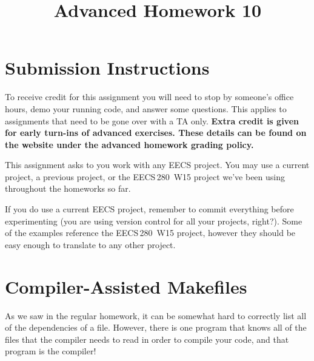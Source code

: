 \documentclass{article}
\begin{document}
\fancyfoot[C]{\color{gray} \thepage~/~\pageref*{LastPage}}
\pagestyle{fancyplain}

\title{\textbf{Advanced Homework 10\\}}
\author{\textbf{\color{red}{Due: Wednesday, March 21st, 11:59PM (Hard Deadline)}}}
\date{}
\maketitle


\section*{Submission Instructions}
To receive credit for this assignment you will need to stop by someone's
office hours, demo your running code, and answer some questions. \textbf{\color{red}{Make sure
to check the office hour schedule as the real due date is at the last office
hours before the date listed above.}} This applies to assignments that need to be gone over with a TA only.
\textbf{Extra credit is given for early turn-ins of advanced exercises. These details can be found on the website under the advanced homework grading policy.}


\begin{mdframed}[innerleftmargin=38pt,innerrightmargin=38pt]\justify
  This assignment asks to you work with any EECS project. You may use a
  current project, a previous project, or the EECS\,280~W15 project we've been
  using throughout the homeworks so far.

  If you do use a current EECS project, remember to commit everything before
  experimenting (you are using version control for all your projects, right?).
  Some of the examples reference the EECS\,280~W15 project, however they should
  be easy enough to translate to any other project.
\end{mdframed}

\section{Compiler-Assisted Makefiles}

As we saw in the regular homework, it can be somewhat hard to correctly list
all of the dependencies of a file. However, there is one program that knows
all of the files that the compiler needs to read in order to compile your
code, and that program is the compiler!
\end{document}
